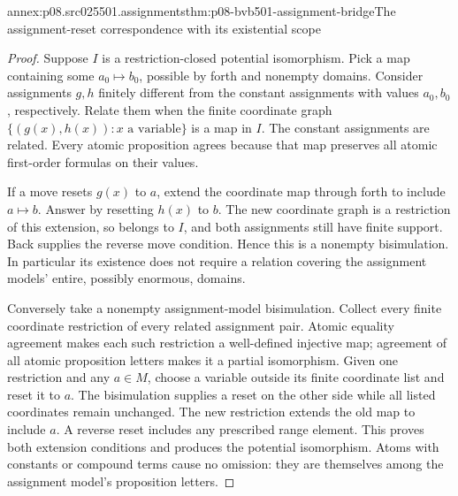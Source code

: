 \begin{annexitem}{annex:p08.src025501.assignments}{thm:p08-bvb501-assignment-bridge}{The assignment-reset correspondence with its existential scope}
\begin{proof}
Suppose \(I\) is a restriction-closed potential isomorphism. Pick a map
containing some \(a_0\mapsto b_0\), possible by forth and nonempty
domains. Consider assignments \(g,h\) finitely different from the
constant assignments with values \(a_0,b_0\), respectively. Relate them
when the finite coordinate graph
\(\{(g(x),h(x)):x\text{ a variable}\}\) is a map in \(I\).
The constant assignments are related. Every atomic proposition agrees
because that map preserves all atomic first-order formulas on their values.

If a move resets \(g(x)\) to \(a\), extend the coordinate map through
forth to include \(a\mapsto b\). Answer by resetting \(h(x)\) to
\(b\). The new coordinate graph is a restriction of this extension,
so belongs to \(I\), and both assignments still have finite support.
Back supplies the reverse move condition. Hence this is a nonempty
bisimulation. In particular its existence does not require a relation
covering the assignment models' entire, possibly enormous, domains.

Conversely take a nonempty assignment-model bisimulation. Collect every
finite coordinate restriction of every related assignment pair. Atomic
equality agreement makes each such restriction a well-defined injective
map; agreement of all atomic proposition letters makes it a partial
isomorphism. Given one restriction and any \(a\in M\), choose a
variable outside its finite coordinate list and reset it to \(a\).
The bisimulation supplies a reset on the other side while all listed
coordinates remain unchanged. The new restriction extends the old map
to include \(a\). A reverse reset includes any prescribed range element.
This proves both extension conditions and produces the potential
isomorphism. Atoms with constants or compound terms cause no omission:
they are themselves among the assignment model's proposition letters.
\end{proof}
\end{annexitem}

